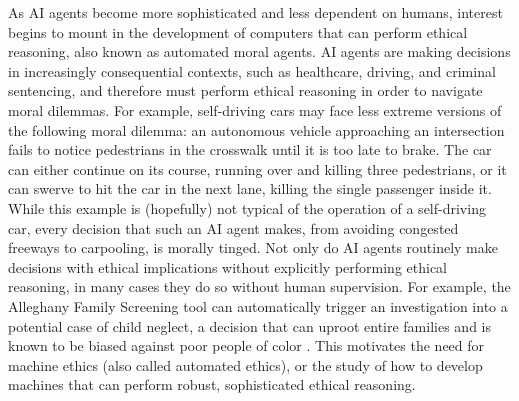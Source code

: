 %
\begin{isabellebody}%
%
%
\isadelimtheory
%
\endisadelimtheory
%
\isatagtheory
%
\endisatagtheory
{\isafoldtheory}%
%
\isadelimtheory
%
\endisadelimtheory
%
\isadelimdocument
%
\endisadelimdocument
%
\isatagdocument
%
\isamarkuptrue%
%
\endisatagdocument
{\isafolddocument}%
%
\isadelimdocument
%
\endisadelimdocument
%
\begin{isamarkuptext}%
As AI agents become more sophisticated and less dependent on humans, interest begins to mount
in the development of computers that can perform ethical reasoning, also known as automated moral agents. 
AI agents are making decisions in increasingly 
consequential contexts, such as healthcare, driving, and criminal sentencing, and therefore 
must perform ethical reasoning in order to navigate moral dilemmas. For example, self-driving
cars may face less extreme versions of the following moral dilemma: an autonomous vehicle approaching 
an intersection fails to notice pedestrians in the crosswalk until it is too late to brake. The car 
can either continue on its course, running over and killing three pedestrians, or it can swerve to 
hit the car in the next lane, killing the single passenger inside it. While this example is (hopefully) 
not typical of the operation of a self-driving car, every decision that such an AI agent makes, from 
avoiding congested freeways to carpooling, is morally tinged. Not only do AI agents routinely make decisions with 
ethical implications without explicitly performing ethical
reasoning, in many cases they do so without human supervision. For example, the Alleghany Family Screening 
tool can automatically trigger an investigation into a potential case of child neglect, a decision that 
can uproot entire families and is known to be biased against poor people of color \citep{eubanks}. 
This motivates the need for machine ethics (also called automated ethics), 
or the study of how to develop machines that can perform robust, sophisticated ethical reasoning. 


\end{isamarkuptext}
\end{isabellebody}
